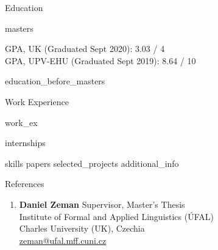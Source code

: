 \documentclass{resume}
\begin{document}


\begin{rSection}{Education}

    {masters}
            
            GPA, UK (Graduated Sept 2020): 3.03 / 4\\
            GPA, UPV-EHU (Graduated Sept 2019): 8.64 / 10
    
    {education_before_masters}
    
\end{rSection}


\begin{rSection}{Work Experience}

    {work_ex}
            
    {internships}

\end{rSection}


{skills}
{papers}
{selected_projects}
{additional_info}


\begin{rSection}{References}

    \begin{enumerate}
        {common references}

        \item \textbf{Daniel Zeman} \hfill Supervisor, Master's Thesis\\
            Institute of Formal and Applied Linguistics ({\'U}FAL)\\
            Charles University (UK), Czechia\\
            \faEnvelope \hspace{0.5mm} \href{mailto:zeman@ufal.mff.cuni.cz}{zeman@ufal.mff.cuni.cz}
    \end{enumerate}

\end{rSection}
\end{document}
